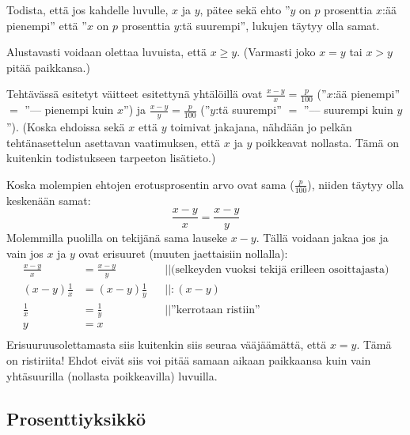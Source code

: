 \begin{esimerkki} 
Todista, että jos kahdelle luvulle, $x$ ja $y$, pätee sekä ehto ''$y$ on $p$ prosenttia $x$:ää pienempi'' että ''$x$ on $p$ prosenttia $y$:tä suurempi'', lukujen täytyy olla samat.
		\begin{esimratk}
Alustavasti voidaan olettaa luvuista, että $x \geq y$. (Varmasti joko $x=y$ tai $x>y$ pitää paikkansa.) %

Tehtävässä esitetyt väitteet esitettynä yhtälöillä ovat $\frac{x-y}{x}=\frac{p}{100}$ (''$x$:ää pienempi'' $=$ ''{--}{--} pienempi kuin $x$'') ja $\frac{x-y}{y}=\frac{p}{100}$ (''$y$:tä suurempi'' $=$ ''{--}{--} suurempi kuin $y$''). (Koska ehdoissa sekä $x$ että $y$ toimivat jakajana, nähdään jo pelkän tehtänasettelun asettavan vaatimuksen, että $x$ ja $y$ poikkeavat nollasta. Tämä on kuitenkin todistukseen tarpeeton lisätieto.)

Koska molempien ehtojen erotusprosentin arvo ovat sama ($\frac{p}{100}$), niiden täytyy olla keskenään samat:
$$\frac{x-y}{x}=\frac{x-y}{y}$$
Molemmilla puolilla on tekijänä sama lauseke $x-y$. Tällä voidaan jakaa jos ja vain jos $x$ ja $y$ ovat erisuuret (muuten jaettaisiin nollalla):
\begin{align*}
\frac{x-y}{x}&=\frac{x-y}{y} && ||\text{(selkeyden vuoksi tekijä erilleen osoittajasta)}\\
(x-y)\frac{1}{x}&=(x-y)\frac{1}{y} &&||:(x-y) \\
\frac{1}{x}&=\frac{1}{y} && ||\text{''kerrotaan ristiin''} \\
y&=x && \\
\end{align*}
Erisuuruusolettamasta siis kuitenkin siis seuraa vääjäämättä, että $x=y$. Tämä on ristiriita! Ehdot eivät siis voi pitää samaan aikaan paikkaansa kuin vain yhtäsuurilla (nollasta poikkeavilla) luvuilla. %
		\end{esimratk}
\end{esimerkki}

\subsection{Prosenttiyksikkö}


